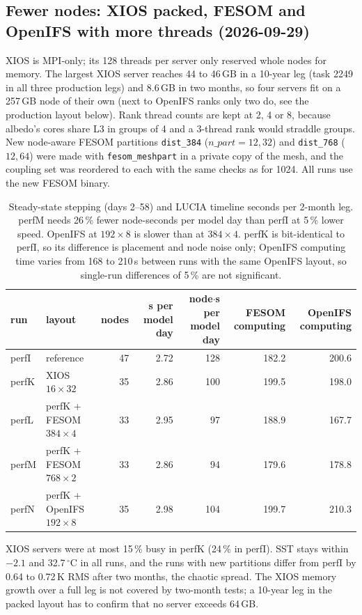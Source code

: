 \documentclass[11pt,a4paper]{article}
\begin{document}
\subsection{Fewer nodes: XIOS packed, FESOM and OpenIFS with more threads (2026-09-29)}
XIOS is MPI-only; its 128 threads per server only reserved whole nodes for memory. The largest XIOS server reaches 44 to 46\,GB in a 10-year leg (task 2249 in all three production legs) and 8.6\,GB in two months, so four servers fit on a 257\,GB node of their own (next to OpenIFS ranks only two do, see the production layout below). Rank thread counts are kept at 2, 4 or 8, because albedo's cores share L3 in groups of 4 and a 3-thread rank would straddle groups. New node-aware FESOM partitions \texttt{dist\_384} ($n\_part = 12, 32$) and \texttt{dist\_768} ($12, 64$) were made with \texttt{fesom\_meshpart} in a private copy of the mesh, and the coupling set was reordered to each with the same checks as for 1024. All runs use the new FESOM binary.
\begin{table}[H]\centering\small
\begin{tabular}{llrrrrr}\toprule
run & layout & nodes & s per model day & node$\cdot$s per model day & FESOM computing & OpenIFS computing\\\midrule
perfI & reference & 47 & 2.72 & 128 & 182.2 & 200.6\\
perfK & XIOS $16\times32$ & 35 & 2.86 & 100 & 199.5 & 198.0\\
perfL & perfK + FESOM $384\times4$ & 33 & 2.95 & 97 & 188.9 & 167.7\\
perfM & perfK + FESOM $768\times2$ & 33 & 2.86 & 94 & 179.6 & 178.8\\
perfN & perfK + OpenIFS $192\times8$ & 35 & 2.98 & 104 & 199.7 & 210.3\\\bottomrule
\end{tabular}
\caption{Steady-state stepping (days 2--58) and LUCIA timeline seconds per 2-month leg. perfM needs 26\,\% fewer node-seconds per model day than perfI at 5\,\% lower speed. OpenIFS at $192\times8$ is slower than at $384\times4$. perfK is bit-identical to perfI, so its difference is placement and node noise only; OpenIFS computing time varies from 168 to 210\,s between runs with the same OpenIFS layout, so single-run differences of 5\,\% are not significant.}\label{tab:nodes}
\end{table}
XIOS servers were at most 15\,\% busy in perfK (24\,\% in perfI). SST stays within $-2.1$ and 32.7\,$^\circ$C in all runs, and the runs with new partitions differ from perfI by 0.64 to 0.72\,K RMS after two months, the chaotic spread. The XIOS memory growth over a full leg is not covered by two-month tests; a 10-year leg in the packed layout has to confirm that no server exceeds 64\,GB.
\end{document}
